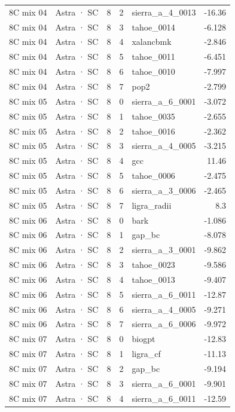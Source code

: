\begin{tabular}{llrrlr}
8C mix 04 & Astra · SC & 8 & 2 & sierra\_a\_4\_0013 & -16.36 \\
8C mix 04 & Astra · SC & 8 & 3 & tahoe\_0014 & -6.128 \\
8C mix 04 & Astra · SC & 8 & 4 & xalancbmk & -2.846 \\
8C mix 04 & Astra · SC & 8 & 5 & tahoe\_0011 & -6.451 \\
8C mix 04 & Astra · SC & 8 & 6 & tahoe\_0010 & -7.997 \\
8C mix 04 & Astra · SC & 8 & 7 & pop2 & -2.799 \\
8C mix 05 & Astra · SC & 8 & 0 & sierra\_a\_6\_0001 & -3.072 \\
8C mix 05 & Astra · SC & 8 & 1 & tahoe\_0035 & -2.655 \\
8C mix 05 & Astra · SC & 8 & 2 & tahoe\_0016 & -2.362 \\
8C mix 05 & Astra · SC & 8 & 3 & sierra\_a\_4\_0005 & -3.215 \\
8C mix 05 & Astra · SC & 8 & 4 & gcc & 11.46 \\
8C mix 05 & Astra · SC & 8 & 5 & tahoe\_0006 & -2.475 \\
8C mix 05 & Astra · SC & 8 & 6 & sierra\_a\_3\_0006 & -2.465 \\
8C mix 05 & Astra · SC & 8 & 7 & ligra\_radii & 8.3 \\
8C mix 06 & Astra · SC & 8 & 0 & bark & -1.086 \\
8C mix 06 & Astra · SC & 8 & 1 & gap\_bc & -8.078 \\
8C mix 06 & Astra · SC & 8 & 2 & sierra\_a\_3\_0001 & -9.862 \\
8C mix 06 & Astra · SC & 8 & 3 & tahoe\_0023 & -9.586 \\
8C mix 06 & Astra · SC & 8 & 4 & tahoe\_0013 & -9.407 \\
8C mix 06 & Astra · SC & 8 & 5 & sierra\_a\_6\_0011 & -12.87 \\
8C mix 06 & Astra · SC & 8 & 6 & sierra\_a\_4\_0005 & -9.271 \\
8C mix 06 & Astra · SC & 8 & 7 & sierra\_a\_6\_0006 & -9.972 \\
8C mix 07 & Astra · SC & 8 & 0 & biogpt & -12.83 \\
8C mix 07 & Astra · SC & 8 & 1 & ligra\_cf & -11.13 \\
8C mix 07 & Astra · SC & 8 & 2 & gap\_bc & -9.194 \\
8C mix 07 & Astra · SC & 8 & 3 & sierra\_a\_6\_0001 & -9.901 \\
8C mix 07 & Astra · SC & 8 & 4 & sierra\_a\_6\_0011 & -12.59 \\

\end{tabular}
